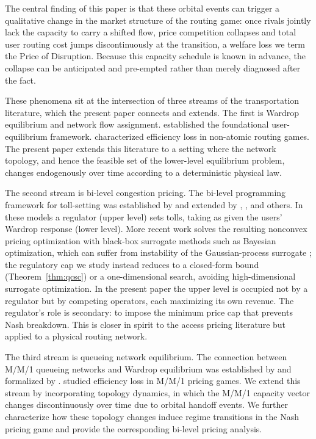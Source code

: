 \documentclass[review,3p,authoryear]{elsarticle}
\begin{document}
The central finding of this paper is that these orbital events can trigger a qualitative change in the market structure of the routing game: once rivals jointly lack the capacity to carry a shifted flow, price competition collapses and total user routing cost jumps discontinuously at the transition, a welfare loss we term the Price of Disruption. Because this capacity schedule is known in advance, the collapse can be anticipated and pre-empted rather than merely diagnosed after the fact.

These phenomena sit at the intersection of three streams of the transportation literature, which the present paper connects and extends. The first is Wardrop equilibrium and network flow assignment. \cite{wardrop1952road, beckmann1956studies, daganzo1977traffic, sheffi1985urban} established the foundational user-equilibrium framework. \cite{roughgarden2002bad, roughgarden2005selfish} characterized efficiency loss in non-atomic routing games. The present paper extends this literature to a setting where the network topology, and hence the feasible set of the lower-level equilibrium problem, changes endogenously over time according to a deterministic physical law.

The second stream is bi-level congestion pricing. The bi-level programming framework for toll-setting was established by \cite{labbe1998bilevel} and extended by \cite{dewez2008new}, \cite{ban2006general}, and others. In these models a regulator (upper level) sets tolls, taking as given the users' Wardrop response (lower level). More recent work solves the resulting nonconvex pricing optimization with black-box surrogate methods such as Bayesian optimization, which can suffer from instability of the Gaussian-process surrogate \citep{huo2023bayesian}; the regulatory cap we study instead reduces to a closed-form bound (Theorem~\ref{thm:qcsc}) or a one-dimensional search, avoiding high-dimensional surrogate optimization. In the present paper the upper level is occupied
not by a regulator but by competing operators, each maximizing its own revenue. The
regulator's role is secondary: to impose the minimum price cap that prevents Nash
breakdown. This is closer in spirit to the access pricing literature \citet{Armstrong2001, laffont1993theory} but applied to a physical routing network.

The third stream is queueing network equilibrium. The connection between M/M/1 queueing networks and Wardrop equilibrium was established by \cite{darroch1972} and formalized by \cite{bertsekas1987}. \cite{johari2004efficiency,acemoglu2007competition} studied efficiency loss in M/M/1 pricing games. We extend this stream by incorporating topology dynamics, in which the M/M/1 capacity vector changes discontinuously over time due to orbital handoff events. We further characterize how these topology changes induce regime transitions in the Nash pricing game and provide the corresponding bi-level pricing analysis.
\end{document}
